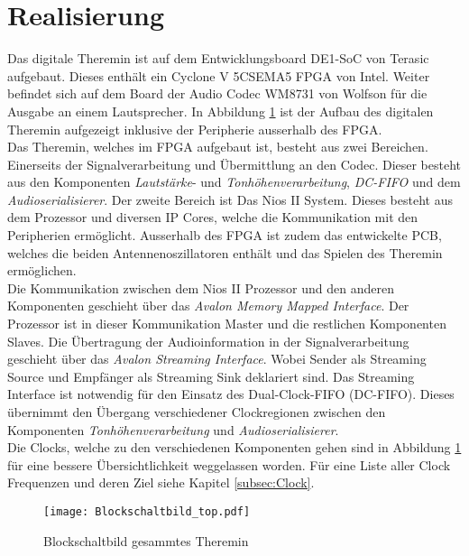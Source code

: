 

\clearpage
\section{Realisierung}\label{sec:Realisierung}

Das digitale Theremin ist auf dem Entwicklungsboard DE1-SoC von Terasic aufgebaut. Dieses enthält ein Cyclone V 5CSEMA5 FPGA von Intel. Weiter befindet sich auf dem Board der Audio Codec WM8731 von Wolfson für die Ausgabe an einem Lautsprecher. In Abbildung \ref{img:Blockschaltbild_top} ist der Aufbau des digitalen Theremin aufgezeigt inklusive der Peripherie ausserhalb des FPGA.\\
Das Theremin, welches im FPGA aufgebaut ist, besteht aus zwei Bereichen. Einerseits der Signalverarbeitung und Übermittlung an den Codec. Dieser besteht aus den Komponenten \textit{Lautstärke}- und \textit{Tonhöhenverarbeitung}, \textit{DC-FIFO} und dem \textit{Audioserialisierer}. Der zweite Bereich ist Das Nios II System. Dieses besteht aus dem Prozessor und diversen IP Cores, welche die Kommunikation mit den Peripherien ermöglicht. Ausserhalb des FPGA ist zudem das entwickelte PCB, welches die beiden Antennenoszillatoren enthält und das Spielen des Theremin ermöglichen.\\
Die Kommunikation zwischen dem Nios II Prozessor und den anderen Komponenten geschieht über das \textit{Avalon Memory Mapped Interface}. Der Prozessor ist in dieser Kommunikation Master und die restlichen Komponenten Slaves. Die Übertragung der Audioinformation in der Signalverarbeitung geschieht über das \textit{Avalon Streaming Interface}. Wobei Sender als Streaming Source und Empfänger als Streaming Sink deklariert sind. Das Streaming Interface ist notwendig für den Einsatz des Dual-Clock-FIFO (DC-FIFO). Dieses übernimmt den Übergang verschiedener Clockregionen zwischen den Komponenten \textit{Tonhöhenverarbeitung} und \textit{Audioserialisierer}.\\
Die Clocks, welche zu den verschiedenen Komponenten gehen sind in Abbildung \ref{img:Blockschaltbild_top} für eine bessere Übersichtlichkeit weggelassen worden. Für eine Liste aller Clock Frequenzen und deren Ziel siehe Kapitel \ref{subsec:Clock}.

\begin{figure}[h!]
	\centering
	\texttt{[image: Blockschaltbild\_top.pdf]}
	\caption{Blockschaltbild gesammtes Theremin} 
	\label{img:Blockschaltbild_top}
\end{figure}  

\clearpage

